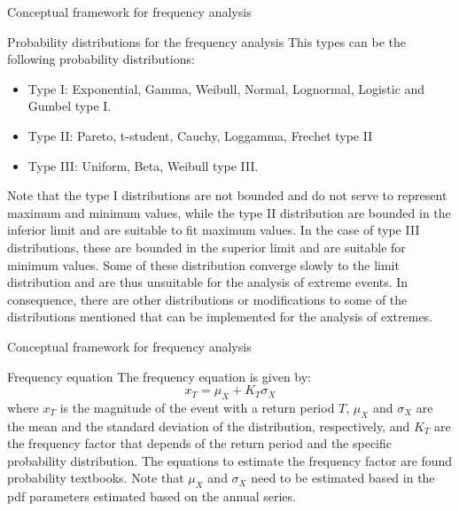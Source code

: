 \documentclass[8pt]{beamer}
\renewcommand{\emph}[1]{\textcolor{myorange}{#1}}
\begin{document}
\begin{frame}{Conceptual framework for  frequency analysis}
    \begin{block}{Probability distributions for the frequency analysis}
        This types can be the following probability distributions:
        \begin{itemize}
            \item \emph{Type I:} Exponential, Gamma, Weibull, Normal, Lognormal, Logistic and Gumbel type I.
            \item \emph{Type II:} Pareto, t-student, Cauchy, Loggamma, Frechet type II
            \item \emph{Type III:} Uniform, Beta, Weibull type III.
        \end{itemize}
        Note that the \emph{type I} distributions are not bounded and do not serve to represent maximum and minimum values, while the \emph{type II} distribution are bounded in the inferior limit and are suitable to fit maximum values. In the case of \emph{type III} distributions, these are bounded in the superior limit and are suitable for minimum values. 
 Some of these distribution converge slowly to the limit distribution and are thus unsuitable for the analysis of extreme events. In consequence, there are other distributions or modifications to some of the distributions mentioned that can be implemented for the analysis of extremes. 
  \end{block}
\end{frame}

\begin{frame}{Conceptual framework for  frequency analysis}
    \begin{block}{Frequency equation}
        The \alert{frequency equation} is given by:
        \[
            x_T = \mu_X + K_T \sigma_X
        \] 
        where $x_T$ is the magnitude of the event with a return period $T$, $\mu_X$ and $\sigma_X$ are the mean and the standard deviation of the distribution, respectively, and $K_T$ are the \alert{frequency factor} that depends of the return period and the specific probability distribution. The equations to estimate the frequency factor are found probability textbooks. Note that $\mu_X$ and $\sigma_X$ need to be estimated based in the \emph{pdf} parameters estimated based on the annual series.

 \end{block}
\end{frame}
\end{document}
